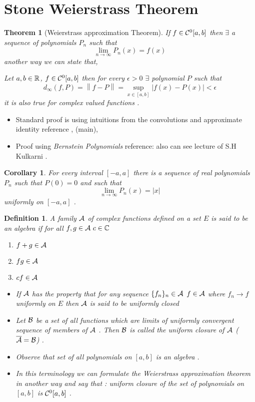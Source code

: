 \documentclass{article}
\newcommand{\abs}[1]{\left|#1\right|}
\newcommand{\norm}[1]{\left\lVert {#1} \right\rVert}
\newtheorem{theorem}{Theorem}[section]
\newtheorem{defn}{Definition}[section]
\newtheorem{corollary}{Corollary}[theorem]
\begin{document}
\section{Stone Weierstrass Theorem }
\begin{theorem}[Weierstrass approximation Theorem]
If $f\in \mathcal{C}^0[a,b]$  then $\exists$ a sequence of polynomials $P_n$ such that \[\lim\limits_{n\to \infty} P_n(x)=f(x)\] another way we can state that, \par
Let $a,b\in \mathbb{R}$, $f\in \mathcal{C}^0[a,b]$  then for every $\epsilon>0$ $\exists$ polynomial $P$ such that \[d_{\infty}(f,P) = \norm{f-P}=\sup_{x\in[a,b]}\abs{f(x)-P(x)}<\epsilon\] 
it is also true for complex valued functions .\end{theorem}
\begin{itemize}
    \item Standard proof is using intuitions from the convolutions and approximate identity reference \cite{rudin}, \cite{notes19}(main), \cite{pugh}
    \item Proof using \textit{Bernstein Polynomials} reference: \cite{pugh} also can see lecture of S.H Kulkarni .
\end{itemize}
\begin{corollary}
    For every interval $[-a,a]$ there is a sequence of real polynomials $P_n$ such that $P(0)=0$ and such that \[\lim\limits_{n\to \infty} P_n(x) = |x|\] uniformly on $[-a,a]$ .
\end{corollary}
\begin{defn}\cite{rudin}
    A family $\mathcal{A}$ of complex functions  defined on a set $E$ is said to be an algebra if for all $f,g\in \mathcal{A} \  c\in \mathbb{C}$ \begin{enumerate}[label=(\roman*)]
        \item $f+g\in \mathcal{A} $
        \item $fg\in \mathcal{A}$ 
        \item $cf\in \mathcal{A}  $
    \end{enumerate} \begin{itemize}
        \item If $\mathcal{A}$ has the property that for any sequence $\{f_n\}_n \in \mathcal{A}$ $f\in \mathcal{A}$  where $f_n \to f$ uniformly on $E$  then $\mathcal{A}$ is said to be \textit{uniformly closed} 
        \item Let $\mathcal{B}$ be a set of all functions which are limits of uniformly convergent sequence of members of $\mathcal{A}$ . Then $\mathcal{B}$ is called the uniform closure  of $\mathcal{A}$ ($\overline{\mathcal{A}}=\mathcal{B}$) .  
        \item Observe that set of all polynomials on $[a,b]$ is an algebra .
        \item In this terminology we can formulate the Weierstrass approximation theorem in another way and say that : uniform closure of the set of polynomials on $[a,b]$ is $\mathcal{C}^0[a,b]$ .
    \end{itemize}
\end{defn}
\end{document}
